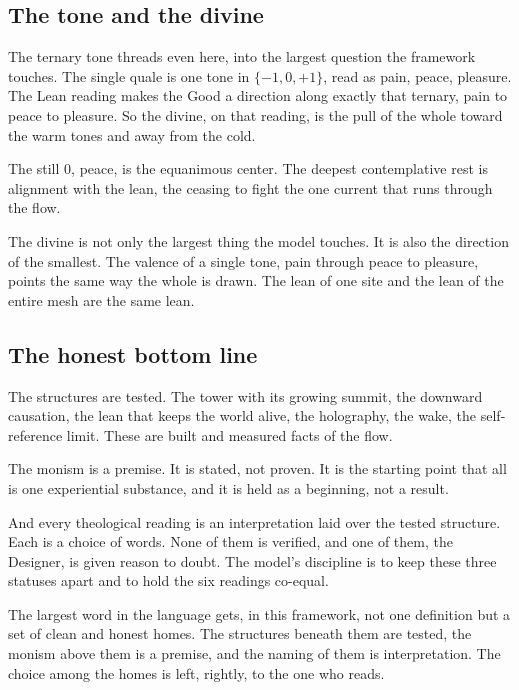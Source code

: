\subsection{The tone and the divine}

The ternary tone threads even here, into the largest question the framework touches. The single quale is one tone in $\{-1, 0, +1\}$, read as pain, peace, pleasure. The Lean reading makes the Good a direction along exactly that ternary, pain to peace to pleasure. So the divine, on that reading, is the pull of the whole toward the warm tones and away from the cold.

The still $0$, peace, is the equanimous center. The deepest contemplative rest is alignment with the lean, the ceasing to fight the one current that runs through the flow.

\begin{result}
The divine is not only the largest thing the model touches. It is also the direction of the smallest. The valence of a single tone, pain through peace to pleasure, points the same way the whole is drawn. The lean of one site and the lean of the entire mesh are the same lean.
\end{result}

\subsection{The honest bottom line}

The structures are tested. The tower with its growing summit, the downward causation, the lean that keeps the world alive, the holography, the wake, the self-reference limit. These are built and measured facts of the flow.

The monism is a premise. It is stated, not proven. It is the starting point that all is one experiential substance, and it is held as a beginning, not a result.

And every theological reading is an interpretation laid over the tested structure. Each is a choice of words. None of them is verified, and one of them, the Designer, is given reason to doubt. The model's discipline is to keep these three statuses apart and to hold the six readings co-equal.

\begin{principle}
The largest word in the language gets, in this framework, not one definition but a set of clean and honest homes. The structures beneath them are tested, the monism above them is a premise, and the naming of them is interpretation. The choice among the homes is left, rightly, to the one who reads.
\end{principle}
